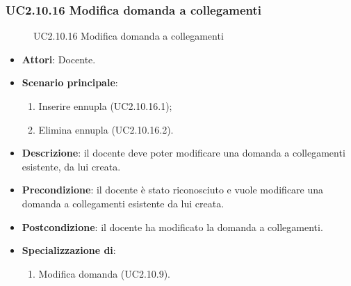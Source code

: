 \subsubsection{UC2.10.16 Modifica domanda a collegamenti}
\begin{figure}[H]
\centering
\noindent{}
\caption{UC2.10.16 Modifica domanda a collegamenti}
\end{figure}
\begin{itemize}
\item \textbf{Attori}: Docente.
\item \textbf{Scenario principale}:
\begin{enumerate}
\item Inserire ennupla (UC2.10.16.1);
\item Elimina ennupla (UC2.10.16.2).
\end{enumerate}
\item \textbf{Descrizione}: il docente deve poter modificare una domanda a collegamenti esistente, da lui creata.
\item \textbf{Precondizione}: il docente è stato riconosciuto e vuole modificare una domanda a collegamenti esistente da lui creata.
\item \textbf{Postcondizione}: il docente ha modificato la domanda a collegamenti.
\item \textbf{Specializzazione di}:
\begin{enumerate}
\item Modifica domanda (UC2.10.9).
\end{enumerate}
\end{itemize}
